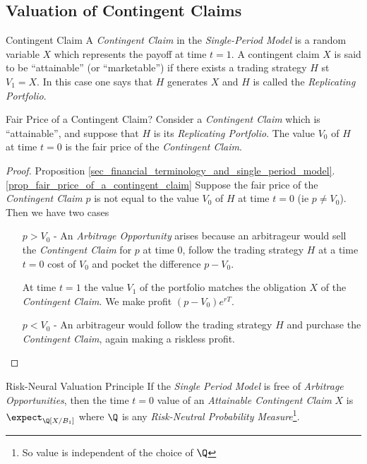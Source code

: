 \documentclass[11pt,a4paper]{article}
\begin{document}
\subsection{Valuation of Contingent Claims}

  \begin{definition}{Contingent Claim}
    A \textit{Contingent Claim} in the \textit{Single-Period Model} is a random variable $X$ which represents the payoff at time $t=1$. A contingent claim $X$ is said to be ``attainable'' (or ``marketable'') if there exists a trading strategy $H$ st $V_1=X$. In this case one says that $H$ generates $X$ and $H$ is called the \textit{Replicating Portfolio}.
  \end{definition}

  \begin{proposition}{Fair Price of a Contingent Claim?}\label{prop_fair_price_of_a_contingent_claim}
    Consider a \textit{Contingent Claim} which is ``attainable'', and suppose that $H$ is its \textit{Replicating Portfolio}. The value $V_0$ of $H$ at time $t=0$ is the fair price of the \textit{Contingent Claim}.
  \end{proposition}

  \begin{proof}{Proposition \ref{sec_financial_terminology_and_single_period_model}.\ref{prop_fair_price_of_a_contingent_claim}}
    Suppose the fair price of the \textit{Contingent Claim} $p$ is not equal to the value $V_0$ of $H$ at time $t=0$ (ie $p\neq V_0$). Then we have two cases
    \begin{itemize}
      \item[$p>V_0$] - An \textit{Arbitrage Opportunity} arises because an arbitrageur would sell the \textit{Contingent Claim} for $p$ at time 0, follow the trading strategy $H$ at a time $t=0$ cost of $V_0$ and pocket the difference $p-V_0$.
      \par At time $t=1$ the value $V_1$ of the portfolio matches the obligation $X$ of the \textit{Contingent Claim}. We make profit $(p-V_0)e^{rT}$.
      \item[$p<V_0$] - An arbitrageur would follow the trading strategy $H$ and purchase the \textit{Contingent Claim}, again making a riskless profit.
    \end{itemize}
  \end{proof}

  \begin{theorem}{Risk-Neural Valuation Principle}
    If the \textit{Single Period Model} is free of \textit{Arbitrage Opportunities}, then the time $t=0$ value of an \textit{Attainable Contingent Claim} $X$ is $\expect_\Q[X/B_1]$ where $\Q$ is any \textit{Risk-Neutral Probability Measure}\footnote{So value is independent of the choice of $\Q$}.
  \end{theorem}
\end{document}

